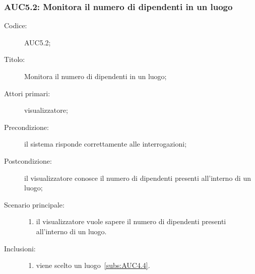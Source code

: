 \documentclass[../../../analisi-dei-requisiti.tex]{subfiles}
\begin{document}
\subsubsection{AUC5.2: Monitora il numero di dipendenti in un luogo}%
\label{subs:AUC5.2}
\begin{description}
  \item[Codice:] AUC5.2;
  \item[Titolo:] Monitora il numero di dipendenti in un luogo;
  \item[Attori primari:] visualizzatore;
  \item[Precondizione:] il sistema risponde correttamente alle interrogazioni;
  \item[Postcondizione:] il visualizzatore conosce il numero di dipendenti presenti all'interno di un luogo;
  \item[Scenario principale:]
  \begin{enumerate}
    \item il visualizzatore vuole sapere il numero di dipendenti presenti all'interno di un luogo.
  \end{enumerate}
  \item[Inclusioni:]
  \begin{enumerate}
    \item viene scelto un luogo~\ref{subs:AUC4.4}.
  \end{enumerate}
\end{description}
\end{document}
